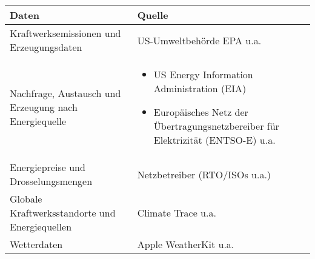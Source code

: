 \begin{tabular}{|p{6cm}|p{8cm}|}
    \hline
    Daten & Quelle \\ \hline \hline
    Kraftwerksemissionen und \newline Erzeugungsdaten & US-Umweltbehörde EPA u.a. \\ \hline
    Nachfrage, Austausch und \newline Erzeugung nach Energiequelle &
    \vspace{-\topsep}
    \begin{itemize}
        \item US Energy Information Administration (EIA)
        \item Europäisches Netz der Übertragungsnetzbereiber für Elektrizität (ENTSO-E) u.a.
    \end{itemize}
    \vspace{-\topsep}
    \\ \hline
    Energiepreise und \newline Drosselungsmengen & Netzbetreiber (RTO/ISOs u.a.) \\ \hline
    Globale Kraftwerksstandorte und Energiequellen & Climate Trace u.a. \\ \hline
    Wetterdaten & Apple WeatherKit u.a. \\ \hline
\end{tabular}
